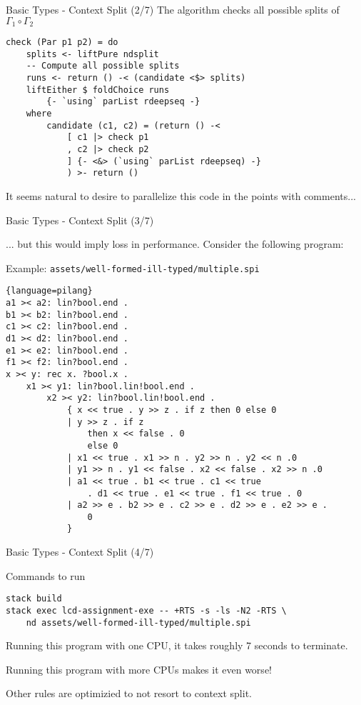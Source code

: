 \begin{frame}[fragile]{Basic Types - Context Split (2/7)}
    The algorithm checks all possible splits of $\Gamma_1 \circ \Gamma_2$
    \small\begin{verbatim}
check (Par p1 p2) = do
    splits <- liftPure ndsplit 
    -- Compute all possible splits
    runs <- return () -< (candidate <$> splits)
    liftEither $ foldChoice runs 
        {- `using` parList rdeepseq -}
    where
        candidate (c1, c2) = (return () -< 
            [ c1 |> check p1
            , c2 |> check p2 
            ] {- <&> (`using` parList rdeepseq) -} 
            ) >- return ()
    \end{verbatim}
    It seems natural to desire to parallelize this code in the points with comments...
\end{frame}

\begin{frame}[fragile]{Basic Types - Context Split (3/7)}
    
    ... but this would imply loss in performance. Consider the following program:
    \begin{exampleblock}{Example: \texttt{assets/well-formed-ill-typed/multiple.spi}}
\tiny\begin{lstlisting}{language=pilang}
a1 >< a2: lin?bool.end .
b1 >< b2: lin?bool.end .
c1 >< c2: lin?bool.end .
d1 >< d2: lin?bool.end .
e1 >< e2: lin?bool.end .
f1 >< f2: lin?bool.end .
x >< y: rec x. ?bool.x .
    x1 >< y1: lin?bool.lin!bool.end .
        x2 >< y2: lin?bool.lin!bool.end .
            { x << true . y >> z . if z then 0 else 0
            | y >> z . if z
                then x << false . 0
                else 0
            | x1 << true . x1 >> n . y2 >> n . y2 << n .0
            | y1 >> n . y1 << false . x2 << false . x2 >> n .0
            | a1 << true . b1 << true . c1 << true 
                . d1 << true . e1 << true . f1 << true . 0
            | a2 >> e . b2 >> e . c2 >> e . d2 >> e . e2 >> e . 
                0
            }
        \end{lstlisting}
    \end{exampleblock}
\end{frame}

\begin{frame}[fragile]{Basic Types - Context Split (4/7)}
    
    \begin{block}{Commands to run}
        \small\begin{verbatim}
stack build
stack exec lcd-assignment-exe -- +RTS -s -ls -N2 -RTS \
    nd assets/well-formed-ill-typed/multiple.spi
        \end{verbatim}
    \end{block}
    Running this program with one CPU, it takes roughly 7 seconds to terminate.
    \vspace{0.5cm}

    Running this program with more CPUs makes it even worse!

    \vspace{0.5cm}

    Other rules are optimizied to not resort to context split.
\end{frame}

